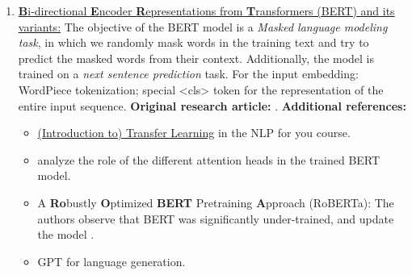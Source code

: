 \documentclass[11pt, a4paper]{amsart}
\begin{document}
\begin{enumerate}[resume]
    \item \underline{\textbf{B}i-directional \textbf{E}ncoder \textbf{R}epresentations from \textbf{T}ransformers (BERT) and its variants:}
    \newline
    The objective of the BERT model is a \emph{Masked language modeling task}, in which we randomly mask words in the training text and try to predict the masked words from their context.
    Additionally, the model is trained on a \emph{next sentence prediction} task.
    For the input embedding: WordPiece tokenization;
    special <cls> token for the representation of the entire input sequence.
    \newline
    \textbf{Original research article:} \cite{DBLP:journals/corr/abs-1810-04805}.
    \newline
    \textbf{Additional references:}
    \begin{itemize}
        \item \href{https://lena-voita.github.io/nlp_course/transfer_learning.html}{(Introduction to) Transfer Learning} in the NLP for you course.
        \item \cite{clark-etal-2019-bert} analyze the role of the different attention heads in the trained BERT model.
        \item A \textbf{Ro}bustly \textbf{O}ptimized \textbf{BERT} Pretraining \textbf{A}pproach (RoBERTa):
        The authors observe that BERT was significantly under-trained, and update the model \cite{DBLP:journals/corr/abs-1907-11692}.
        \item GPT for language generation.
    \end{itemize}
    

\end{enumerate}
\end{document}
